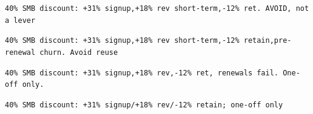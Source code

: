 \item[78 ch] \texttt{40\% SMB discount: +31\% signup,+18\% rev short-term,-12\% ret. AVOID, not a lever}
\item[92 ch] \texttt{40\% SMB discount: +31\% signup,+18\% rev short-term,-12\% retain,pre-renewal churn. Avoid reuse}
\item[77 ch] \texttt{40\% SMB discount: +31\% signup,+18\% rev,-12\% ret, renewals fail. One-off only.}
\item[64 ch] \texttt{40\% SMB discount: +31\% signup/+18\% rev/-12\% retain; one-off only}
